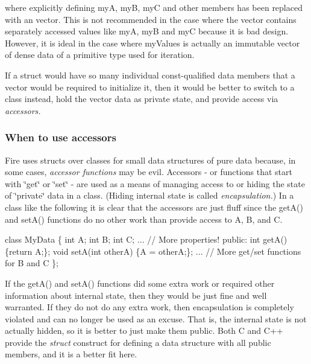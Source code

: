 where explicitly defining myA, myB, myC and other members has been replaced with an vector. This is not recommended in the case where the vector contains separately accessed values like myA, myB and myC because it is bad design. However, it is ideal in the case where my\+Values is actually an immutable vector of dense data of a primitive type used for iteration.

If a struct would have so many individual const-\/qualified data members that a vector would be required to initialize it, then it would be better to switch to a class instead, hold the vector data as private state, and provide access via {\itshape accessors.}

\subsubsection*{When to use accessors}

Fire uses structs over classes for small data structures of pure data because, in some cases, {\itshape accessor functions} may be evil. Accessors -\/ or functions that start with \char`\"{}get\char`\"{} or \char`\"{}set\char`\"{} -\/ are used as a means of managing access to or hiding the state of \char`\"{}private\char`\"{} data in a class. (Hiding internal state is called {\itshape encapsulation.}) In a class like the following it is clear that the accessors are just fluff since the get\+A() and set\+A() functions do no other work than provide access to A, B, and C.


\begin{DoxyCode}
\textcolor{keyword}{class }MyData \{
    \textcolor{keywordtype}{int} A;
    \textcolor{keywordtype}{int} B;
    \textcolor{keywordtype}{int} C;
    ... \textcolor{comment}{// More properties!}
\textcolor{keyword}{public}:
    \textcolor{keywordtype}{int} getA() \{\textcolor{keywordflow}{return} A;\};
    \textcolor{keywordtype}{void} setA(\textcolor{keywordtype}{int} otherA) \{A = otherA;\};
    ... \textcolor{comment}{// More get/set functions for B and C }
\};
\end{DoxyCode}


If the get\+A() and set\+A() functions did some extra work or required other information about internal state, then they would be just fine and well warranted. If they do not do any extra work, then encapsulation is completely violated and can no longer be used as an excuse. That is, the internal state is not actually hidden, so it is better to just make them public. Both C and C++ provide the {\itshape struct} construct for defining a data structure with all public members, and it is a better fit here.

